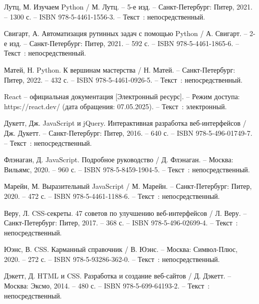
\begin{thebibliography}{9}

     Лутц, М. Изучаем Python / М. Лутц. – 5-е изд. – Санкт-Петербург: Питер, 2021. – 1300 с. – ISBN 978-5-4461-1556-3. – Текст~: непосредственный.

     Свигарт, А. Автоматизация рутинных задач с помощью Python / А. Свигарт. – 2-е изд. – Санкт-Петербург: Питер, 2021. – 592 с. – ISBN 978-5-4461-1865-6. – Текст~: непосредственный.

     Матей, Н. Python. К вершинам мастерства / Н. Матей. – Санкт-Петербург: Питер, 2022. – 432 с. – ISBN 978-5-4461-0926-5. – Текст~: непосредственный.

     React – официальная документация [Электронный ресурс]. – Режим доступа: https://react.dev/ (дата обращения: 07.05.2025). – Текст~: электронный.

     Дукетт, Дж. JavaScript и jQuery. Интерактивная разработка веб-интерфейсов / Дж. Дукетт. – Санкт-Петербург: Питер, 2016. – 640 с. – ISBN 978-5-496-01749-7. – Текст~: непосредственный.

     Флэнаган, Д. JavaScript. Подробное руководство / Д. Флэнаган. – Москва: Вильямс, 2020. – 960 с. – ISBN 978-5-8459-1904-5. – Текст~: непосредственный.

     Марейн, М. Выразительный JavaScript / М. Марейн. – Санкт-Петербург: Питер, 2020. – 472 с. – ISBN 978-5-4461-1188-6. – Текст~: непосредственный.

     Веру, Л. CSS-секреты. 47 советов по улучшению веб-интерфейсов / Л. Веру. – Санкт-Петербург: Питер, 2017. – 368 с. – ISBN 978-5-496-02699-4. – Текст~: непосредственный.

     Юэнс, В. CSS. Карманный справочник / В. Юэнс. – Москва: Символ-Плюс, 2020. – 272 с. – ISBN 978-5-93286-362-0. – Текст~: непосредственный.

     Дэкетт, Д. HTML и CSS. Разработка и создание веб-сайтов / Д. Дэкетт. – Москва: Эксмо, 2014. – 480 с. – ISBN 978-5-699-64193-2. – Текст~: непосредственный.

\end{thebibliography}
